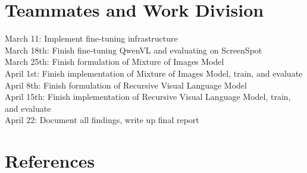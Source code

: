 \documentclass{article}
\begin{document}
\section{Teammates and Work Division}
March 11: Implement fine-tuning infrastructure\\
March 18th: Finish fine-tuning QwenVL and evaluating on ScreenSpot\\
March 25th: Finish formulation of Mixture of Images Model\\
April 1st: Finish implementation of Mixture of Images Model, train, and evaluate\\
April 8th: Finish formulation of Recursive Visual Language Model\\
April 15th: Finish implementation of Recursive Visual Language Model, train, and evaluate\\
April 22: Document all findings, write up final report

\section*{References}
\medskip
\end{document}
